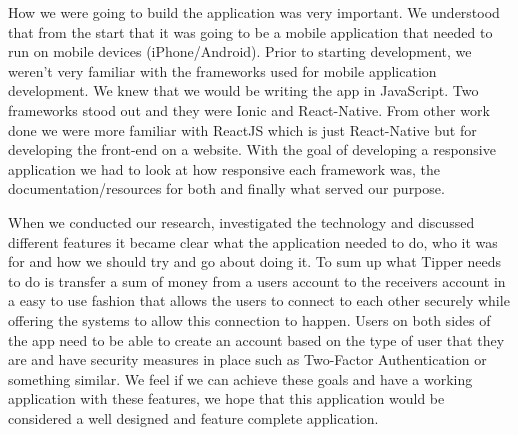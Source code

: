 How we were going to build the application was very important. We understood that from the start that it was going to be a mobile application that needed to run on mobile devices (iPhone/Android). Prior to starting development, we weren't very familiar with the frameworks used for mobile application development. We knew that we would be writing the app in JavaScript. Two frameworks stood out and they were Ionic and React-Native. From other work done we were more familiar with ReactJS which is just React-Native but for developing the front-end on a website. With the goal of developing a responsive application we had to look at how responsive each framework was, the documentation/resources for both and finally what served our purpose.

When we conducted our research, investigated the technology and discussed different features it became clear what the application needed to do, who it was for and how we should try and go about doing it. To sum up what Tipper needs to do is transfer a sum of money from a users account to the receivers account in a easy to use fashion that allows the users to connect to each other securely while offering the systems to allow this connection to happen. Users on both sides of the app need to be able to create an account based on the type of user that they are and have security measures in place such as Two-Factor Authentication or something similar. We feel if we can achieve these goals and have a working application with these features, we hope that this application would be considered a well designed and feature complete application.